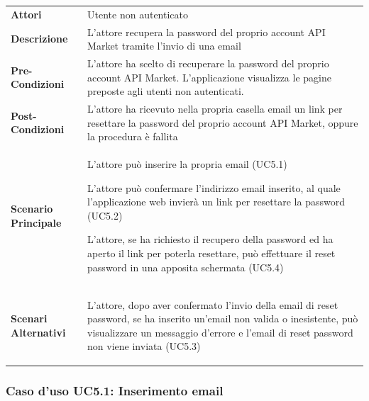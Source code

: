\begin{longtable}{ l | p{11cm}}
	\hline
	\rowcolor{Gray}
	 \multicolumn{2}{c}{UC5 - Recupero password} \\
	 \hline
	\textbf{Attori} & Utente non autenticato \\
	\textbf{Descrizione} & L'attore recupera la password del proprio account API Market tramite l'invio di una email \\
	\textbf{Pre-Condizioni} & L'attore ha scelto di recuperare la password del proprio account API Market. L'applicazione visualizza le pagine preposte agli utenti non autenticati. \\
	\textbf{Post-Condizioni} & L'attore ha ricevuto nella propria casella email un link per resettare la password del proprio account API Market, oppure la procedura è fallita \\
	\textbf{Scenario Principale} & 
	\begin{enumerate*}[label=(\arabic*.),itemjoin={\newline}]
		\item L'attore può inserire la propria email (UC5.1)
		\item L'attore può confermare l'indirizzo email inserito, al quale l'applicazione web invierà un link per resettare la password (UC5.2)
		\item L'attore, se ha richiesto il recupero della password ed ha aperto il link per poterla resettare, può effettuare il reset password in una apposita schermata (UC5.4)
	\end{enumerate*}\\
	\textbf{Scenari Alternativi} & 
	\begin{enumerate*}[label=(\arabic*.),itemjoin={\newline}]
		\item L'attore, dopo aver confermato l'invio della email di reset password, se ha inserito un'email non valida o inesistente, può visualizzare un messaggio d'errore e l'email di reset password non viene inviata (UC5.3)
	\end{enumerate*}\\
\end{longtable}

\subsubsection{Caso d'uso UC5.1: Inserimento email}
\label{UC5_1}

